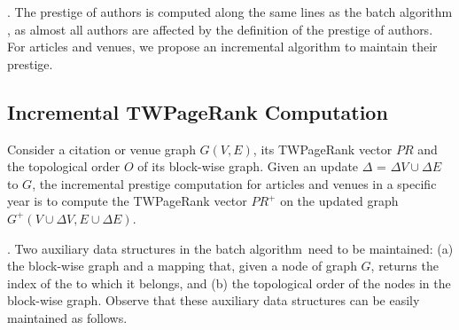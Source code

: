.
The prestige of authors is computed along the same lines as the batch algorithm \batensemble,
as almost all authors are affected  by the definition of the prestige of authors.
%
For articles and venues, we propose an incremental algorithm to maintain their prestige.







\subsection{Incremental TWPageRank Computation}
\label{subsec-incTWPageRank-computation}





Consider a citation or venue graph $G(V, E)$, its TWPageRank vector $PR$ and the topological order $O$ of its block-wise graph. Given an update $\Delta$ = $\Delta V\cup\Delta E$ to $G$, the incremental prestige computation for articles and venues in a specific year is to compute the TWPageRank vector $PR^+$ on the updated graph $G^+(V\cup\Delta V, E\cup\Delta E)$.


.
Two auxiliary data structures in the batch algorithm~\twprscc need to be maintained: (a) the block-wise graph and  a mapping that, given a node of graph $G$, returns the index of the \scc to which it belongs, and (b) the topological order of the nodes in the block-wise graph.
%
Observe that these auxiliary data structures can be easily maintained as follows.


